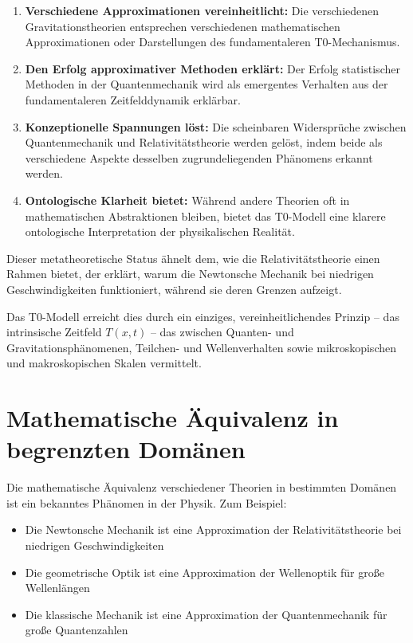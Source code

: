 \documentclass[12pt,a4paper]{article}
\newcommand{\Tfieldt}{T(x,t)}
\begin{document}
	\begin{enumerate}
		\item \textbf{Verschiedene Approximationen vereinheitlicht:} Die verschiedenen Gravitationstheorien entsprechen verschiedenen mathematischen Approximationen oder Darstellungen des fundamentaleren T0-Mechanismus.
		
		\item \textbf{Den Erfolg approximativer Methoden erklärt:} Der Erfolg statistischer Methoden in der Quantenmechanik wird als emergentes Verhalten aus der fundamentaleren Zeitfelddynamik erklärbar.
		
		\item \textbf{Konzeptionelle Spannungen löst:} Die scheinbaren Widersprüche zwischen Quantenmechanik und Relativitätstheorie werden gelöst, indem beide als verschiedene Aspekte desselben zugrundeliegenden Phänomens erkannt werden.
		
		\item \textbf{Ontologische Klarheit bietet:} Während andere Theorien oft in mathematischen Abstraktionen bleiben, bietet das T0-Modell eine klarere ontologische Interpretation der physikalischen Realität.
	\end{enumerate}
	
	Dieser metatheoretische Status ähnelt dem, wie die Relativitätstheorie einen Rahmen bietet, der erklärt, warum die Newtonsche Mechanik bei niedrigen Geschwindigkeiten funktioniert, während sie deren Grenzen aufzeigt.
	
	Das T0-Modell erreicht dies durch ein einziges, vereinheitlichendes Prinzip – das intrinsische Zeitfeld $\Tfieldt$ – das zwischen Quanten- und Gravitationsphänomenen, Teilchen- und Wellenverhalten sowie mikroskopischen und makroskopischen Skalen vermittelt.
	
	\section{Mathematische Äquivalenz in begrenzten Domänen}
	\label{sec:domains}
	
	Die mathematische Äquivalenz verschiedener Theorien in bestimmten Domänen ist ein bekanntes Phänomen in der Physik. Zum Beispiel:
	
	\begin{itemize}
		\item Die Newtonsche Mechanik ist eine Approximation der Relativitätstheorie bei niedrigen Geschwindigkeiten
		\item Die geometrische Optik ist eine Approximation der Wellenoptik für große Wellenlängen
		\item Die klassische Mechanik ist eine Approximation der Quantenmechanik für große Quantenzahlen
	\end{itemize}
	
\end{document}
